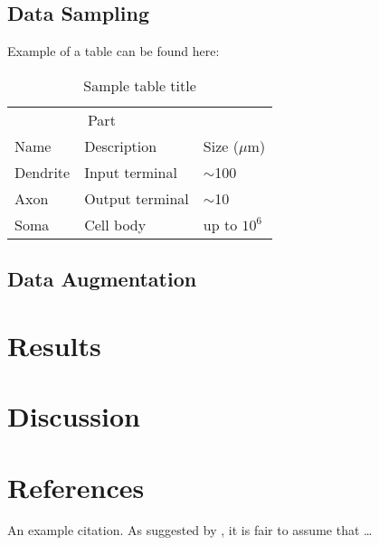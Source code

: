 \documentclass{article}
\begin{document}
\subsection{Data Sampling}

Example of a table can be found here:

\begin{table}
  \caption{Sample table title}
  \label{sample-table}
  \centering
  \begin{tabular}{lll}
    \toprule
    \multicolumn{2}{c}{Part}                   \\
    \cmidrule(r){1-2}
    Name     & Description     & Size ($\mu$m) \\
    \midrule
    Dendrite & Input terminal  & $\sim$100     \\
    Axon     & Output terminal & $\sim$10      \\
    Soma     & Cell body       & up to $10^6$  \\
    \bottomrule
  \end{tabular}
\end{table}

\subsection{Data Augmentation}

\section{Results}

\section{Discussion}

\section*{References}

An example citation. As suggested by \cite{Lee2009a}, it is fair to assume that \dots

\printbibliography
\end{document}
